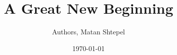 \documentclass[11pt,letterpaper]{article}
\theoremstyle{plain} %
\theoremstyle{definition} %
\theoremstyle{remark} %
\newcommand{\doclearpage}{%
  \iffull\clearpage\else\fi
}
\begin{document}


\title{A Great New Beginning}
%
\author{Authors, Matan Shtepel} %
\date{\today}


\maketitle






%

\appendix
% 

\doclearpage

\end{document}
